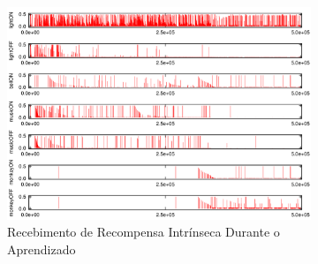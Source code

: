 \documentclass[kdmile,a4paper]{kdmile} %
\newcommand{\tr}[1]{\textcolor{MidnightBlue}{\textbf{#1}}}
\begin{document}
\begin{figure}
  \begin{subfigure}[t]{\textwidth}
    \includegraphics[width=\textwidth]{r_i-2014-07-12_07-15-03-Teri}
    \caption{Recebimento de Recompensa Intrínseca Durante o Aprendizado}
    \label{fig:ri}
  \end{subfigure}
  \caption{}\label{fig:res}
\end{figure}


\end{document}
